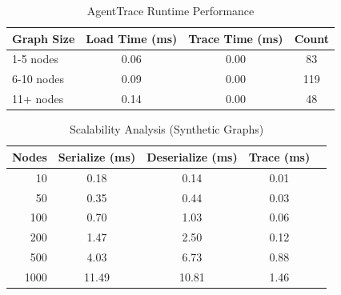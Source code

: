 
\begin{table}[t]
\centering
\caption{AgentTrace Runtime Performance}
\label{tab:performance}
\begin{tabular}{lccc}
\toprule
\textbf{Graph Size} & \textbf{Load Time (ms)} & \textbf{Trace Time (ms)} & \textbf{Count} \\
\midrule
1-5 nodes & 0.06 & 0.00 & 83 \\
6-10 nodes & 0.09 & 0.00 & 119 \\
11+ nodes & 0.14 & 0.00 & 48 \\

\bottomrule
\end{tabular}
\end{table}

\begin{table}[t]
\centering
\caption{Scalability Analysis (Synthetic Graphs)}
\label{tab:scalability}
\begin{tabular}{rcccc}
\toprule
\textbf{Nodes} & \textbf{Serialize (ms)} & \textbf{Deserialize (ms)} & \textbf{Trace (ms)} \\
\midrule
10 & 0.18 & 0.14 & 0.01 \\
50 & 0.35 & 0.44 & 0.03 \\
100 & 0.70 & 1.03 & 0.06 \\
200 & 1.47 & 2.50 & 0.12 \\
500 & 4.03 & 6.73 & 0.88 \\
1000 & 11.49 & 10.81 & 1.46 \\

\bottomrule
\end{tabular}
\end{table}
